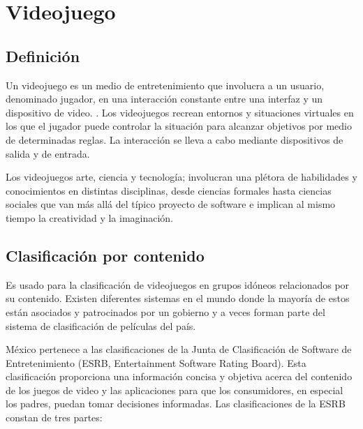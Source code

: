 \section{Videojuego}
\subsection{Definición}
Un videojuego es un medio de entretenimiento que involucra a un usuario, denominado jugador, en una interacción constante entre una interfaz y un dispositivo de video\cite[Morales Urrutia, 2010]{defVid}.
\cite{Baz}. Los videojuegos recrean	entornos y situaciones virtuales en los que el jugador puede controlar la situación para alcanzar objetivos por medio de determinadas reglas. La interacción se lleva a cabo mediante dispositivos de salida y de entrada.
		
Los videojuegos arte, ciencia y tecnología; involucran una plétora de habilidades y conocimientos en distintas disciplinas, desde ciencias formales hasta ciencias sociales que van más allá del típico proyecto de software e implican al mismo tiempo la creatividad y la imaginación.
					
\subsection{Clasificación por contenido}
	Es usado para la clasificación de videojuegos en grupos idóneos relacionados por su contenido. Existen diferentes sistemas en el mundo donde la mayoría de estos están asociados y patrocinados por un gobierno y a veces forman parte del sistema de clasificación de películas del país.
	
	México pertenece a las clasificaciones de la Junta de Clasificación de Software de Entretenimiento (ESRB, Entertainment Software Rating Board)\cite{vid02}. Esta clasificación proporciona una información concisa y objetiva acerca del contenido de los juegos de video y las aplicaciones para que los consumidores, en especial los padres, puedan tomar decisiones informadas. Las clasificaciones de la ESRB constan de tres partes:
			
